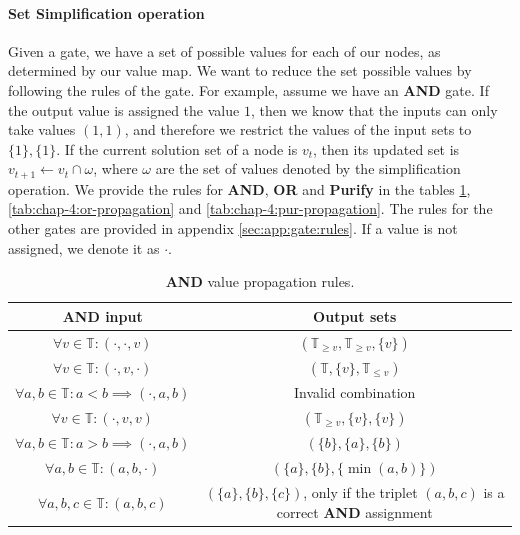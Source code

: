 \paragraph*{Set Simplification operation}
Given a gate, we have a set of possible values for each of our nodes,
as determined by our value map. We want to reduce the set possible values by following the rules of the gate.
For example, assume we have an \textbf{AND} gate.
If the output value is assigned the value $1$, then we know that the inputs can only take values
$(1,1)$, and therefore we restrict the values of the input sets to $\{1\}, \{1\}$.
If the current solution set of a node is $v_t$, then its updated set is
$v_{t+1} \leftarrow v_t \cap \omega$, where $\omega$ are the set of values denoted
by the simplification operation. We provide the rules for \textbf{AND}, \textbf{OR}
and \textbf{Purify} in the tables \ref{tab:chap-4:and-propagation}, \ref{tab:chap-4:or-propagation} and \ref{tab:chap-4:pur-propagation}.
The rules for the other gates are provided in appendix \ref{sec:app:gate:rules}.
If a value is not assigned, we denote it as $\cdot$.

\begin{table}[h!]
    \centering
    \begin{tabular}{|c|c|}
        \hline
        \rowcolor[HTML]{EAE1E1}
        {\color[HTML]{333333} \textbf{AND input}}                  & {\color[HTML]{333333} \textbf{Output sets}}                                                  \\ \hline
        $\forall v \in \mathbb{T}: (\cdot, \cdot, v)$              & $(\mathbb{T}_{\geq v},\mathbb{T}_{\geq v}, \{v\} )$                                          \\ \hline
        $\forall v \in \mathbb{T}: (\cdot, v, \cdot)$              & $(\mathbb{T}, \{v\}, \mathbb{T}_{\leq v})$                                                   \\ \hline
        $\forall a,b \in \mathbb{T}: a < b \implies (\cdot, a, b)$ & Invalid combination                                                                          \\ \hline
        $\forall v \in \mathbb{T}: (\cdot, v, v)$                  & $(\mathbb{T}_{\geq v}, \{v\}, \{v\})$                                                        \\ \hline
        $\forall a,b \in \mathbb{T}:a > b \implies (\cdot, a, b)$  & $(\{b\}, \{a\}, \{b\})$                                                                      \\ \hline
        $\forall a,b \in \mathbb{T}: (a, b, \cdot)$                & $(\{a\}, \{b\}, \{\min(a,b) \})$                                                             \\ \hline
        $\forall a,b,c \in \mathbb{T}:  (a, b, c)$                 & $(\{a\}, \{b\}, \{c \})$, only if the triplet $(a,b,c)$ is a correct \textbf{AND} assignment \\ \hline
    \end{tabular}
    \caption{\textbf{AND} value propagation rules.}
    \label{tab:chap-4:and-propagation}
\end{table}

